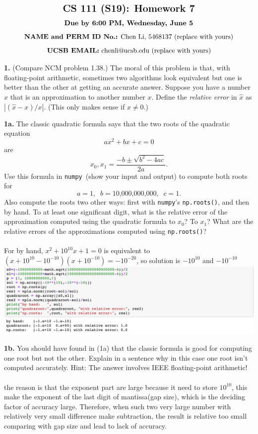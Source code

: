 \documentclass[11pt]{article}
\newcommand{\numpy}{{\tt numpy}}    %
\begin{document}
$$\mbox{\Large \textbf {CS 111 (S19): Homework 7}}$$
$$\mbox{\textbf {Due by 6:00 PM, Wednesday, June 5}}$$
$$\mbox{\textbf {NAME and PERM ID No.:} Chen Li, 5468137 (replace with yours)}$$
$$\mbox{\textbf {UCSB EMAIL:} chenli@ucsb.edu (replace with yours)}$$

\par\bigskip
{\bf 1.} (Compare NCM problem 1.38.)
The moral of this problem is that, with floating-point arithmetic,
sometimes two algorithms look equivalent but one is better than the other
at getting an accurate answer.
Suppose you have a number $\hat x$ that is an approximation to another number $x$.
Define the {\em relative error} in $\hat x$ as 
$|(\hat x - x) / x |$.
(This only makes sense if $x\ne0$.)

\par\medskip
{\bf 1a.}
The classic quadratic formula says that the two roots of the quadratic equation
$$ ax^2 + bx + c = 0$$
are
$$ x_0, x_1 = \frac{-b\pm\sqrt{b^2-4ac}}{2a}. $$
Use this formula in \numpy\ (show your input and output) to compute both roots for
$$ a = 1, \;\; b = \mbox{10,000,000,000}, \;\; c = 1. $$
Also compute the roots two other ways: 
first with \numpy's {\tt np.roots()}, and then by hand.
To at least one significant digit, what is the relative error of the 
approximation computed using the quadratic formula to $x_0$? To $x_1$?
What are the relative errors of the approximations computed using {\tt np.roots()}?\\
\\For by hand, $x^2+10^{10}x+1=0$ is equivalent to $(x+10^{10}-10^{-10})(x+10^{-10})=-10^{-20}$, so solution is $-10^{10}$ and $-10^{-10}$\\
\includegraphics[scale = 0.6]{1a}
\par\medskip
{\bf 1b.}
You should have found in (1a) that the classic formula is good for 
computing one root but not the other. 
Explain in a sentence why in this case one root isn't computed accurately.
Hint: The answer involves IEEE floating-point arithmetic!\\\\
the reason is that the exponent part are large because it need to store $10^{10}$, this make the exponent of the last digit of mantissa(gap size), which is the deciding factor of accuracy large. Therefore, when such two very large number with relatively very small difference make subtraction, the result is relative too small comparing with gap size and lead to lack of accuracy.
\end{document}
